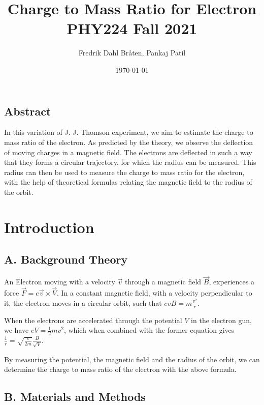 \documentclass[a4paper,12pt]{article}
\begin{document}
\title{Charge to Mass Ratio for Electron \\
\large PHY224 Fall 2021}
\author{Fredrik Dahl Bråten, Pankaj Patil}
\date{\today}
\maketitle
\begin{center}
	\section*{Abstract}
\end{center}

In this variation of J. J. Thomson experiment, we aim to estimate the charge to mass ratio of the electron.
As predicted by the theory, we observe the deflection of moving charges in a magnetic field. The electrons are
deflected in such a way that they forms a circular trajectory, for which the radius can be measured. This
radius can then be used to measure the charge to mass ratio for the electron, with the help of theoretical formulas
relating the magnetic field to the radius of the orbit. 

\section{Introduction}

\subsection*{A. Background Theory}

An Electron moving with a velocity $\vec{v}$ through a magnetic field $\vec{B}$, experiences a force $\vec{F} = e\vec{v}\times \vec{V}$.
In a constant magnetic field, with a velocity perpendicular to it, the electron moves in a circular orbit, such that $evB = m\frac{v^2}{r}$.

When the electrons are accelerated through the potential $V$ in the electron gun, we have $eV = \frac{1}{2}mv^2$, which when combined with the former 
equation gives $\frac{1}{r} = \sqrt{\frac{e}{2m}} \frac{B}{\sqrt{V}}$.

By measuring the potential, the magnetic field and the radius of the orbit, we can determine the charge to mass ratio of the electron with the above formula. 

\subsection*{B. Materials and Methods}
\end{document}
